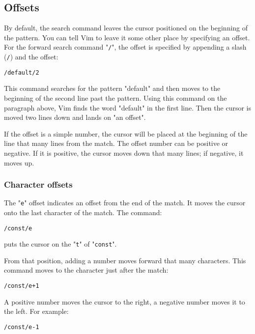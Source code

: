 \subsection{Offsets}
By default, the search command leaves the cursor positioned on the beginning of the pattern.
You can tell Vim to leave it some other place by specifying an offset.
For the forward search command "\verb!/!", the offset is specified by appending a slash (\verb!/!) and the offset:

\begin{Verbatim}[samepage=true]
 /default/2
\end{Verbatim}

This command searches for the pattern "default" and then moves to the beginning of the second line past the pattern.
Using this command on the paragraph above, Vim finds the word "default" in the first line.
Then the cursor is moved two lines down and lands on "an offset".

If the offset is a simple number, the cursor will be placed at the beginning of the line that many lines from the match.
The offset number can be positive or negative.
If it is positive, the cursor moves down that many lines; if negative, it moves up.

\subsubsection{Character offsets}
The "\verb!e!" offset indicates an offset from the end of the match.
It moves the cursor onto the last character of the match.
The command:

\begin{Verbatim}[samepage=true]
 /const/e
\end{Verbatim}

puts the cursor on the "\verb!t!" of "\verb!const!".

From that position, adding a number moves forward that many characters.
This command moves to the character just after the match:

\begin{Verbatim}[samepage=true]
 /const/e+1
\end{Verbatim}

A positive number moves the cursor to the right, a negative number moves it to the left.
For example:

\begin{Verbatim}[samepage=true]
 /const/e-1
\end{Verbatim}

